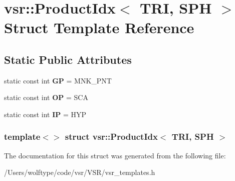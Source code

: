 \hypertarget{structvsr_1_1_product_idx_3_01_t_r_i_00_01_s_p_h_01_4}{\section{vsr\-:\-:Product\-Idx$<$ T\-R\-I, S\-P\-H $>$ Struct Template Reference}
\label{structvsr_1_1_product_idx_3_01_t_r_i_00_01_s_p_h_01_4}
}
\subsection*{Static Public Attributes}
\begin{DoxyCompactItemize}
\item 
\hypertarget{structvsr_1_1_product_idx_3_01_t_r_i_00_01_s_p_h_01_4_a046fb87951431d93ab9e5d15eec2a670}{static const int {\bfseries G\-P} = M\-N\-K\-\_\-\-P\-N\-T}\label{structvsr_1_1_product_idx_3_01_t_r_i_00_01_s_p_h_01_4_a046fb87951431d93ab9e5d15eec2a670}

\item 
\hypertarget{structvsr_1_1_product_idx_3_01_t_r_i_00_01_s_p_h_01_4_a27cc3a3640ead0b7a4143266bb4ce776}{static const int {\bfseries O\-P} = S\-C\-A}\label{structvsr_1_1_product_idx_3_01_t_r_i_00_01_s_p_h_01_4_a27cc3a3640ead0b7a4143266bb4ce776}

\item 
\hypertarget{structvsr_1_1_product_idx_3_01_t_r_i_00_01_s_p_h_01_4_af92637c4369f91e20e8311eb5cbb3a82}{static const int {\bfseries I\-P} = H\-Y\-P}\label{structvsr_1_1_product_idx_3_01_t_r_i_00_01_s_p_h_01_4_af92637c4369f91e20e8311eb5cbb3a82}

\end{DoxyCompactItemize}
\subsubsection*{template$<$$>$ struct vsr\-::\-Product\-Idx$<$ T\-R\-I, S\-P\-H $>$}



The documentation for this struct was generated from the following file\-:\begin{DoxyCompactItemize}
\item 
/\-Users/wolftype/code/vsr/\-V\-S\-R/vsr\-\_\-templates.\-h\end{DoxyCompactItemize}
